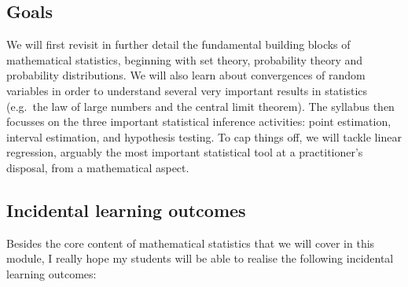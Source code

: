 \documentclass[
]{book}
\theoremstyle{definition}
\theoremstyle{definition}
\theoremstyle{definition}
\theoremstyle{definition}
\theoremstyle{remark}
\begin{document}
\hypertarget{goals}{%
\subsection*{Goals}\label{goals}}

We will first revisit in further detail the fundamental building blocks of mathematical statistics, beginning with set theory, probability theory and probability distributions.
We will also learn about convergences of random variables in order to understand several very important results in statistics (e.g.~the law of large numbers and the central limit theorem).
The syllabus then focusses on the three important statistical inference activities: point estimation, interval estimation, and hypothesis testing.
To cap things off, we will tackle linear regression, arguably the most important statistical tool at a practitioner's disposal, from a mathematical aspect.

\hypertarget{incidental-learning-outcomes}{%
\subsection*{Incidental learning outcomes}\label{incidental-learning-outcomes}}

Besides the core content of mathematical statistics that we will cover in this module, I really hope my students will be able to realise the following incidental learning outcomes:
\end{document}
